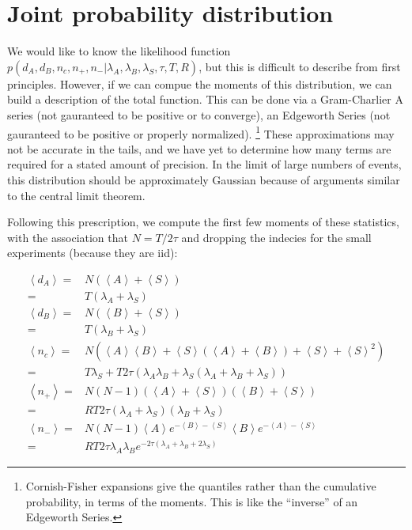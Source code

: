 \documentclass{article}
\newcommand{\e}[1]{\left<#1\right>}
\newcommand{\ea}{\e{A}}
\newcommand{\eb}{\e{B}}
\newcommand{\es}{\e{S}}
\newcommand{\rate}[1]{\lambda_{#1}}
\newcommand{\la}{\rate{A}}
\newcommand{\lb}{\rate{B}}
\newcommand{\ls}{\rate{S}}
\begin{document}
\section{Joint probability distribution}
\label{section:joint pdf}

We would like to know the likelihood function $p(d_A, d_B, n_c, n_+, n_- | \la, \lb, \ls, \tau, T, R)$, but this is difficult to describe from first principles.
However, if we can compue the moments of this distribution, we can build a description of the total function.
This can be done via a Gram-Charlier A series (not gauranteed to be positive or to converge), an Edgeworth Series (not gauranteed to be positive or properly normalized). 
\footnote{Cornish-Fisher expansions give the quantiles rather than the cumulative probability, in terms of the moments. This is like the ``inverse'' of an Edgeworth Series.}
These approximations may not be accurate in the tails, and we have yet to determine how many terms are required for a stated amount of precision.
In the limit of large numbers of events, this distribution should be approximately Gaussian because of arguments similar to the central limit theorem. 

Following this prescription, we compute the first few moments of these statistics, with the association that $N = T / 2\tau$ and dropping the indecies for the small experiments (because they are iid):

\begin{subequations}
	\begin{align}
		\e{d_A} = & N \left(\ea + \es\right) \nonumber \\
		        = & T \left(\la + \ls\right) \\
		\e{d_B} = & N \left(\eb + \es\right) \nonumber \\
		        = & T \left(\lb + \ls\right) \\
		\e{n_c} = & N \left( \ea \eb + \es\left(\ea + \eb\right) + \es + \es^2 \right) \nonumber \\
		        = & T \ls + T 2\tau \left( \la\lb + \ls \left(\la+\lb+\ls\right) \right) \\
		\e{n_+} = & N \left(N-1\right) \left(\ea+\es\right)\left(\eb+\es\right) \nonumber \\
		        = & R T 2\tau \left(\la+\ls\right)\left(\lb+\ls\right) \\
		\e{n_-} = & N\left(N-1\right) \ea e^{-\eb -\es} \eb e^{-\ea -\es} \nonumber \\
		        = & R T 2\tau \la \lb e^{-2\tau\left(\la + \lb + 2\ls\right)} 
	\end{align}
\end{subequations}
\end{document}
